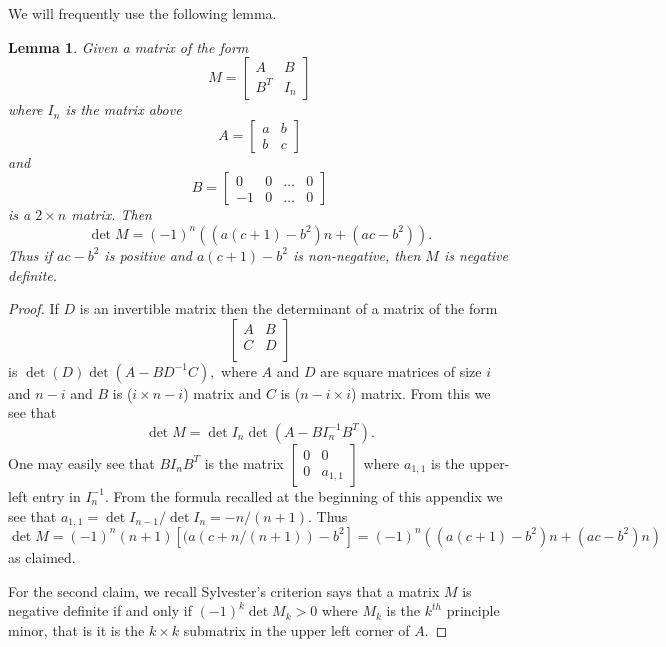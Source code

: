 \documentclass[12pt]{amsart}
\newtheorem{lemma}[theorem]{Lemma}
\theoremstyle{definition}
\theoremstyle{definition}
\begin{document}
		We will frequently use the following lemma.
		\begin{lemma}\label{negdefproof}
			Given a matrix of the form
			\[
			M=\begin{bmatrix}
				A & B\\
				B^T & I_n
			\end{bmatrix}
			\]
			where $I_n$ is the matrix above
			\[
			A=\begin{bmatrix}
				a&b\\
				b&c
			\end{bmatrix}
			\]
			and
			\[
			B=\begin{bmatrix}
				0&0&\ldots &0\\
				-1&0&\ldots &0
			\end{bmatrix}
			\]
			is a $2\times n$ matrix. Then 
			\[
			\det M = (-1)^n((a(c+1)-b^2)n+(ac-b^2)).
			\]
			Thus if $ac-b^2$ is positive and $a(c+1)-b^2$ is non-negative, then $M$ is negative definite.
		\end{lemma}
		\begin{proof}
			If $D$ is an invertible matrix then the determinant of a matrix of the form 
			$$
			\begin{bmatrix}
				A & B  \\
				C & D  \\
			\end{bmatrix}
			$$
			is $\det(D)\det(A-BD^{-1}C),$ where $A$ and $D$ are square matrices of size $i$ and $n-i$ and $B$ is ($i\times n-i$) matrix and $C$ is ($n-i \times i$) matrix. From this we see that 
			\[
			\det M= \det I_n \det (A-BI^{-1}_nB^T).
			\]
			One may easily see that $BI_nB^T$ is the matrix $\begin{bmatrix}
				0&0\\ 0& a_{1,1}
			\end{bmatrix}$
			where $a_{1,1}$ is the upper-left entry in $I_n^{-1}$. From the formula recalled at the beginning of this appendix we see that $a_{1,1}=\det I_{n-1}/\det I_{n}=-n/(n+1)$. Thus
			\[
			\det M= (-1)^n (n+1) [(a(c+n/(n+1))-b^2]=(-1)^n((a(c+1)-b^2)n+(ac-b^2)n)
			\]
			as claimed.
			
			For the second claim, we recall Sylvester's criterion \cite[Theorem~7.2.5]{HJ} says that a matrix $M$ is negative definite if and only if $(-1)^{k}\det M_k>0$ where $M_k$ is the $k^{th}$ principle minor, that is it is the $k\times k$ submatrix in the upper left corner of $A$. 
		\end{proof}
		
\end{document}
